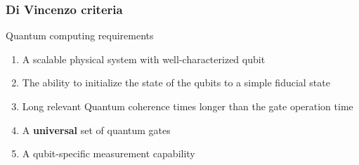 \documentclass{beamer}
\begin{document}
\begin{frame}
\frametitle{Di Vincenzo criteria}

\begin{alertblock}{Quantum computing requirements }
\begin{enumerate}
\item A scalable physical system with well-characterized qubit

\item The ability to initialize the state of the qubits to a simple fiducial state

\item Long relevant Quantum coherence times longer than the gate operation time

\item A \textbf{universal} set of quantum gates

\item A qubit-specific measurement capability
\end{enumerate}

\noindent
\end{alertblock}
\end{frame}
\end{document}
